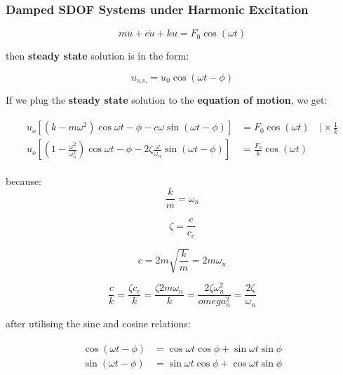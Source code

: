 \documentclass[10pt,b5paper,titlepage]{book}
\newenvironment{eqarray}
{
    \begin{eqnarray}
        \begin{aligned}
}
{
        \end{aligned}
    \end{eqnarray}
}
\begin{document}
\subsubsection{Damped SDOF Systems under Harmonic Excitation}

\begin{equation}
    m \ddot{u} + c \dot{u} + k u = F_0 \cos{\left(\omega t \right)}
\end{equation}

then \textbf{steady state} solution is in the form:

\begin{equation}
    u_{s.s.} = u_0 \cos{\left(\omega t - \phi \right)}
\end{equation}

If we plug the \textbf{steady state} solution to the \textbf{equation of motion},
we get:

\begin{eqarray}
    u_o \left[ \left(k - m \omega^2\right) \cos{\omega t - \phi} -
    c \omega \sin{\left( \omega t - \phi \right)} \right]
    &= F_0 \cos{\left( \omega t \right)} \quad \vert \times \frac{1}{k}\\
        u_o \left[ \left(1 - \frac{\omega^2}{\omega_n^2} \right) \cos{\omega t - \phi} -
        2 \zeta \frac{\omega}{\omega_n} \sin{\left( \omega t - \phi \right)} \right]
    &= \frac{F_0}{k} \cos{\left( \omega t \right)}
\end{eqarray}

because:
\begin{equation}
    \frac{k}{m} = \omega_n
\end{equation}

\begin{equation}
    \zeta = \frac{c}{c_c}
\end{equation}

\begin{equation}
    c = 2 m \sqrt{\frac{k}{m}} = 2 m \omega_n
\end{equation}

\begin{equation}
    \frac{c}{k} = \frac{\zeta c_c}{k} = \frac{\zeta 2 m \omega_n}{k}
    = \frac{2 \zeta \omega_n^2}{omega_n^2} = \frac{2 \zeta}{\omega_n}
\end{equation}

after utilising the sine and cosine relations:

\begin{eqarray}
    \cos{\left( \omega t - \phi \right)} &=
    \cos{\omega t} \cos{\phi} + \sin{\omega t} \sin{\phi}\\
    \sin{\left( \omega t - \phi \right)} &=
    \sin{\omega t} \cos{\phi} + \cos{\omega t} \sin{\phi}
\end{eqarray}
\end{document}
